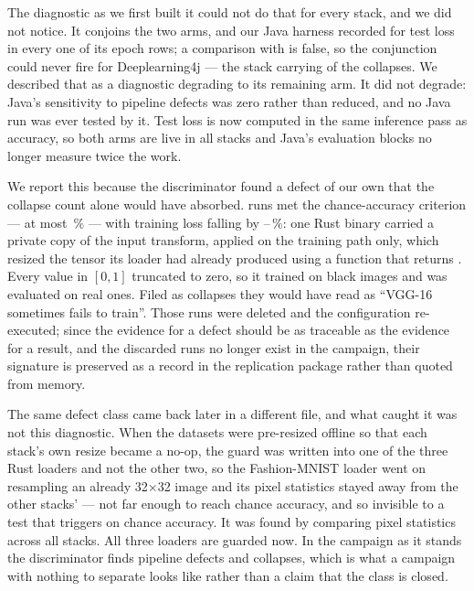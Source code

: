 The diagnostic as we first built it could not do that for every stack, and we
did not notice. It conjoins the two arms, and our Java harness recorded
 for test loss in every one of its epoch rows; a comparison with
 is false, so the conjunction could never fire for Deeplearning4j ---
the stack carrying \vCollapseFirstJava{} of the \vCollapseFirstVgg{} collapses.
We described that as a diagnostic degrading to its remaining arm. It did not
degrade: Java's sensitivity to pipeline defects was zero rather than reduced,
and no Java run was ever tested by it. Test loss is now computed in the same
inference pass as accuracy, so both arms are live in all \vEcosystems{} stacks
and Java's evaluation blocks no longer measure twice the work.

We report this because the discriminator found a defect of our own that the
collapse count alone would have absorbed. \vDefectRuns{} runs met the
chance-accuracy criterion --- at most \vDefectAccMax\,\% --- with training loss
falling by \vDefectLossDropMin--\vDefectLossDropMax\,\%: one Rust binary carried
a private copy of the input transform, applied on the training path only, which
resized the tensor its loader had already produced using a function that returns
. Every value in $[0,1]$ truncated to zero, so it trained on black
images and was evaluated on real ones. Filed as collapses they would have read
as ``VGG-16 sometimes fails to train''. Those runs were deleted and the
configuration re-executed; since the evidence for a defect should be as
traceable as the evidence for a result, and the discarded runs no longer exist
in the campaign, their signature is preserved as a record in the replication
package rather than quoted from memory.

The same defect class came back later in a different file, and what caught it
was not this diagnostic. When the datasets were pre-resized offline so that each
stack's own resize became a no-op, the  guard was written into one
of the three Rust loaders and not the other two, so the Fashion-MNIST loader
went on resampling an already 32$\times$32 image and its pixel statistics stayed
away from the other stacks' --- not far enough to reach chance accuracy, and so
invisible to a test that triggers on chance accuracy. It was found by comparing
pixel statistics across all \vEcosystems{} stacks. All three loaders are guarded
now. In the campaign as it stands the
discriminator finds \vSigPipelineN{} pipeline defects and \vSigCollapseN{}
collapses, which is what a campaign with nothing to separate looks like rather
than a claim that the class is closed.


